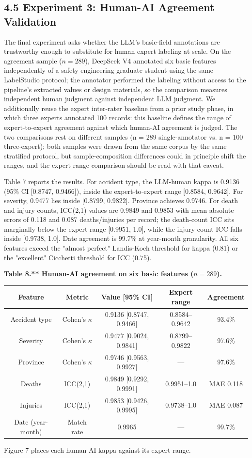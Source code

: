 \documentclass[11pt]{article}
\begin{document}
\subsection{4.5 Experiment 3: Human-AI Agreement Validation}
The final experiment asks whether the LLM's basic-field annotations are trustworthy enough to substitute for human expert labeling at scale. On the agreement sample ($n=289$), DeepSeek V4 annotated six basic features independently of a safety-engineering graduate student using the same LabelStudio protocol; the annotator performed the labeling without access to the pipeline's extracted values or design materials, so the comparison measures independent human judgment against independent LLM judgment. We additionally reuse the expert inter-rater baseline from a prior study phase, in which three experts annotated 100 records: this baseline defines the range of expert-to-expert agreement against which human-AI agreement is judged. The two comparisons rest on different samples (n = 289 single-annotator vs. n = 100 three-expert); both samples were drawn from the same corpus by the same stratified protocol, but sample-composition differences could in principle shift the ranges, and the expert-range comparison should be read with that caveat.

Table 7 reports the results. For accident type, the LLM-human kappa is 0.9136 (95\% CI [0.8747, 0.9466]), inside the expert-to-expert range [0.8584, 0.9642]. For severity, 0.9477 lies inside [0.8799, 0.9822]. Province achieves 0.9746. For death and injury counts, ICC(2,1) values are 0.9849 and 0.9853 with mean absolute errors of 0.118 and 0.087 deaths/injuries per record; the death-count ICC sits marginally below the expert range [0.9951, 1.0], while the injury-count ICC falls inside [0.9738, 1.0]. Date agreement is 99.7\% at year-month granularity. All six features exceed the "almost perfect" Landis-Koch threshold for kappa (0.81) or the "excellent" Cicchetti threshold for ICC (0.75).

\textbf{Table 8.** Human-AI agreement on six basic features ($n=289$).}
\begin{table}[htbp]
\centering
\small
\begin{tabular}{ccccc}
\hline
Feature & Metric & Value [95\% CI] & Expert range & Agreement \\
\hline
Accident type & Cohen's $\kappa$ & 0.9136 [0.8747, 0.9466] & 0.8584--0.9642 & 93.4\% \\
Severity & Cohen's $\kappa$ & 0.9477 [0.9024, 0.9841] & 0.8799--0.9822 & 97.6\% \\
Province & Cohen's $\kappa$ & 0.9746 [0.9563, 0.9927] & --- & 97.6\% \\
Deaths & ICC(2,1) & 0.9849 [0.9292, 0.9991] & 0.9951--1.0 & MAE 0.118 \\
Injuries & ICC(2,1) & 0.9853 [0.9426, 0.9995] & 0.9738--1.0 & MAE 0.087 \\
Date (year-month) & Match rate & 0.9965 & --- & 99.7\% \\
\hline
\end{tabular}
\end{table}
Figure 7 places each human-AI kappa against its expert range.
\end{document}
